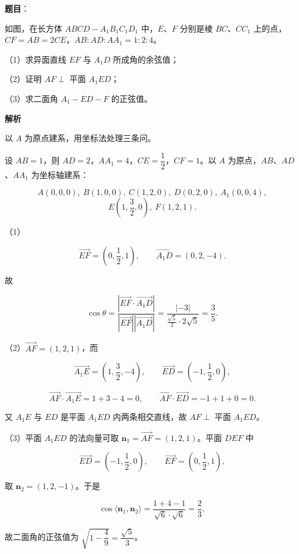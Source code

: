 \begin{answer}

\textbf{题目}：

如图，在长方体 $ABCD-A_1B_1C_1D_1$ 中，$E$、$F$ 分别是棱 $BC$、$CC_1$ 上的点，$CF=AB=2CE$，$AB:AD:AA_1=1:2:4$。

（1）求异面直线 $EF$ 与 $A_1D$ 所成角的余弦值；

（2）证明 $AF\perp$ 平面 $A_1ED$；

（3）求二面角 $A_1-ED-F$ 的正弦值。
\nopagebreak[4]
\begin{center}\end{center}
\nopagebreak[4]
\textbf{解析}

以 $A$ 为原点建系，用坐标法处理三条问。

设 $AB=1$，则 $AD=2$，$AA_1=4$，$CE=\dfrac12$，$CF=1$。以 $A$ 为原点，$AB$、$AD$、$AA_1$ 为坐标轴建系：

\nopagebreak[4]
\[A(0,0,0),\ B(1,0,0),\ C(1,2,0),\ D(0,2,0),\ A_1(0,0,4),\]
\nopagebreak[4]
\[E\left(1,\frac32,0\right),\ F(1,2,1).\]

（1）

\nopagebreak[4]
\[\overrightarrow{EF}=\left(0,\frac12,1\right),\qquad
\overrightarrow{A_1D}=(0,2,-4).\]

故

\nopagebreak[4]
\[\cos\theta=\frac{\left|\overrightarrow{EF}\cdot\overrightarrow{A_1D}\right|}
{|\overrightarrow{EF}||\overrightarrow{A_1D}|}
=\frac{|-3|}{\frac{\sqrt5}2\cdot2\sqrt5}=\frac35.\]

（2）$\overrightarrow{AF}=(1,2,1)$，而

\nopagebreak[4]
\[\overrightarrow{A_1E}=\left(1,\frac32,-4\right),\qquad
\overrightarrow{ED}=\left(-1,\frac12,0\right),\]

\nopagebreak[4]
\[\overrightarrow{AF}\cdot\overrightarrow{A_1E}=1+3-4=0,\qquad
\overrightarrow{AF}\cdot\overrightarrow{ED}=-1+1+0=0.\]

又 $A_1E$ 与 $ED$ 是平面 $A_1ED$ 内两条相交直线，故 $AF\perp$ 平面 $A_1ED$。

（3）平面 $A_1ED$ 的法向量可取 $\boldsymbol n_1=\overrightarrow{AF}=(1,2,1)$。平面 $DEF$ 中

\nopagebreak[4]
\[\overrightarrow{ED}=\left(-1,\frac12,0\right),\qquad
\overrightarrow{EF}=\left(0,\frac12,1\right),\]

取 $\boldsymbol n_2=(1,2,-1)$。于是

\nopagebreak[4]
\[\cos\langle\boldsymbol n_1,\boldsymbol n_2\rangle
=\frac{1+4-1}{\sqrt6\cdot\sqrt6}=\frac23,\]

故二面角的正弦值为 $\sqrt{1-\dfrac49}=\dfrac{\sqrt5}3$。


\end{answer}
